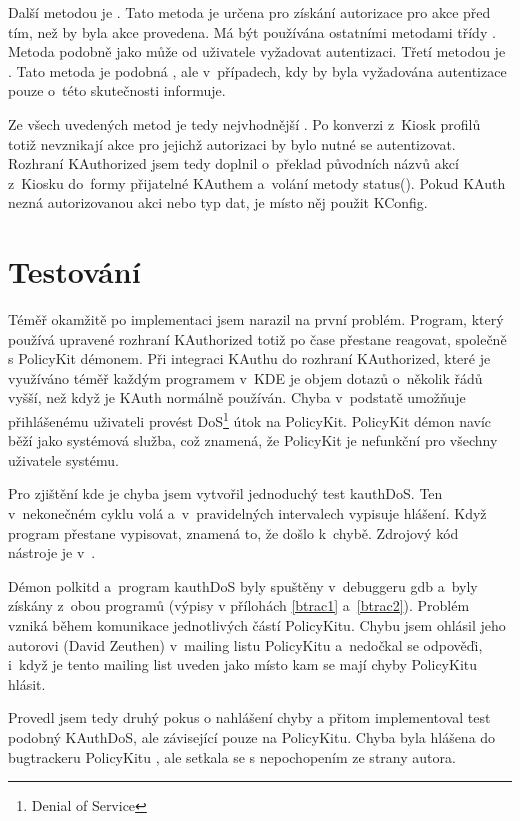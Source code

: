 Další metodou je . Tato metoda je určena pro získání autorizace pro akce před tím, než by byla akce provedena. Má být používána ostatními metodami třídy .  Metoda podobně jako  může od uživatele vyžadovat autentizaci. Třetí metodou je . Tato metoda je podobná , ale v~případech, kdy by byla vyžadována autentizace pouze o~této skutečnosti informuje.

Ze všech uvedených metod je tedy nejvhodnější . Po konverzi z~Kiosk profilů totiž nevznikají akce pro jejichž autorizaci by bylo nutné se autentizovat. Rozhraní KAuthorized jsem tedy doplnil o~překlad původních názvů akcí z~Kiosku do~formy přijatelné KAuthem a~volání metody status(). Pokud KAuth nezná autorizovanou akci nebo typ dat, je místo něj použit KConfig.

\section{Testování}
Téměř okamžitě po implementaci jsem narazil na první problém. Program, který používá upravené rozhraní KAuthorized totiž po čase přestane reagovat, společně s PolicyKit démonem. Při integraci KAuthu do rozhraní KAuthorized, které je využíváno téměř každým programem v~KDE je objem dotazů o~několik řádů vyšší, než když je KAuth normálně používán. Chyba v~podstatě umožňuje přihlášenému uživateli provést DoS\footnote{Denial of Service} útok na PolicyKit. PolicyKit démon navíc běží jako systémová služba, což znamená, že PolicyKit je nefunkční pro všechny uživatele systému.

Pro zjištění kde je chyba jsem vytvořil jednoduchý test kauthDoS. Ten v~nekonečném cyklu volá  a~v~pravidelných intervalech vypisuje hlášení. Když program přestane vypisovat, znamená to, že došlo k~chybě. Zdrojový kód nástroje je v~.

Démon polkitd a~program kauthDoS byly spuštěny v~debuggeru gdb a~byly získány  z~obou programů (výpisy v přílohách \ref{btrac1} a~\ref{btrac2}). Problém vzniká během komunikace jednotlivých částí PolicyKitu. Chybu jsem ohlásil jeho autorovi (David Zeuthen) v~mailing listu PolicyKitu \cite{bugrepmailinglist} a~nedočkal se odpověďi, i~když je tento mailing list uveden jako místo kam se mají chyby PolicyKitu hlásit.

Provedl jsem tedy druhý pokus o nahlášení chyby a přitom implementoval test podobný KAuthDoS, ale závisející pouze na PolicyKitu.
Chyba byla hlášena do bugtrackeru PolicyKitu \cite{bugreptracker}, ale setkala se s nepochopením ze strany autora.


